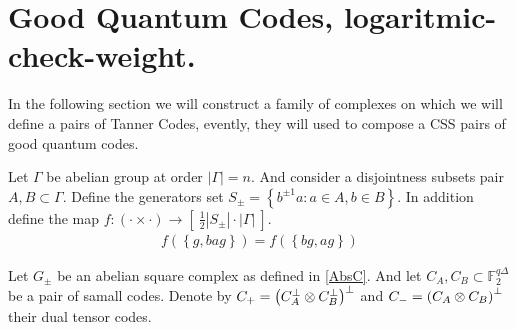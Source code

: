 \section{Good Quantum Codes, logaritmic-check-weight.} 
In the following section we will construct a family of complexes on which we will define a pairs of Tanner Codes, evently, they will used to compose a CSS pairs of good quantum codes.  

\begin{definition} \label{AbsC}
  Let $\Gamma$ be abelian group at order $|\Gamma| = n$. And consider a disjointness subsets pair $A,B \subset \Gamma$. Define the generators set $S_{\pm}  = \left\{ b^{\pm 1} a : a \in A, b \in B   \right\}$. In addition define the map $f : \left( \cdot \times \cdot \right) \rightarrow \left[ \ \frac{1}{2} |S_{\pm}| \cdot |\Gamma|  \ \right]  $. 
\begin{equation*}
  \begin{split}
    f\left( \left\{ g, ba g  \right\}  \right)= f\left( \left\{ bg, ag  \right\}  \right)
  \end{split}
\end{equation*}
\end{definition}

\begin{definition} Let $G_{\pm}$ be an abelian square complex as defined in \ref{AbsC}. And let $C_{A},C_{B} \subset \mathbb{F}_{2}^{q\Delta}$ be a pair of samall codes. Denote by $C_{+} = \left( C_{A}^{\perp}\otimes C_{B}^{\perp} \right)^{\perp}$ and $C_{-} = \left( C_{A}\otimes C_{B}\right)^{\perp} $ their dual tensor codes. 
\end{definition}


